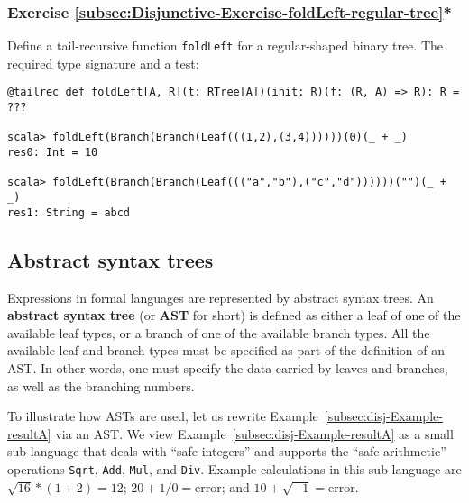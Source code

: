 \subsubsection{Exercise \label{subsec:Disjunctive-Exercise-foldLeft-regular-tree}\ref{subsec:Disjunctive-Exercise-foldLeft-regular-tree}{*}}

Define a tail-recursive function \lstinline!foldLeft! for a regular-shaped
binary tree. The required type signature and a test:
\begin{lstlisting}
@tailrec def foldLeft[A, R](t: RTree[A])(init: R)(f: (R, A) => R): R = ???

scala> foldLeft(Branch(Branch(Leaf(((1,2),(3,4))))))(0)(_ + _)
res0: Int = 10

scala> foldLeft(Branch(Branch(Leaf((("a","b"),("c","d"))))))("")(_ + _)
res1: String = abcd
\end{lstlisting}
\begin{comment}
Solution:

\begin{lstlisting}
@tailrec def foldLeft[A, R](t: RTree[A])(init: R)(f: (R, A) => R): R = t match {
  case Leaf(x)    => f(init, x)
  case Branch(xs) => foldLeft(xs)(init) { case (r, (a, b)) => f(f(r, a), b) } 
}
\end{lstlisting}
\end{comment}


\subsection{Abstract syntax trees}

Expressions in formal languages are represented by abstract syntax
trees. An \textbf{abstract syntax tree}\textbf{
}(or \textbf{AST} for short) is defined as either a leaf of one of
the available leaf types, or a branch of one of the available branch
types. All the available leaf and branch types must be specified as
part of the definition of an AST. In other words, one must specify
the data carried by leaves and branches, as well as the branching
numbers.

To illustrate how ASTs are used, let us rewrite Example~\ref{subsec:disj-Example-resultA}
via an AST. We view Example~\ref{subsec:disj-Example-resultA} as
a small sub-language that deals with \textsf{``}safe integers\textsf{''} and supports
the \textsf{``}safe arithmetic\textsf{''} operations \lstinline!Sqrt!, \lstinline!Add!,
\lstinline!Mul!, and \lstinline!Div!. Example calculations in this
sub-language are $\sqrt{16}*(1+2)=12$; $20+1/0=\text{error}$; and
$10+\sqrt{-1}=\text{error}$. 

